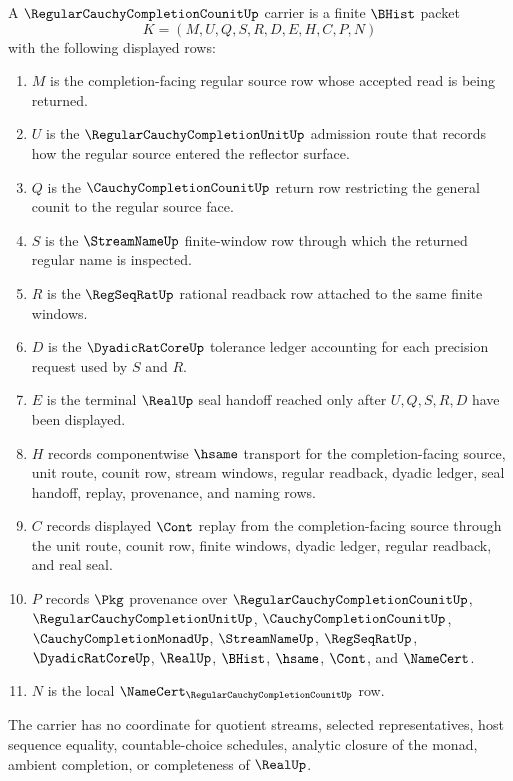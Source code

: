 \begin{definition}
\label{def:regular-cauchy-completion-counit-carrier}
A $\RegularCauchyCompletionCounitUp$ carrier is a finite $\BHist$ packet
$$
K=(M,U,Q,S,R,D,E,H,C,P,N)
$$
with the following displayed rows:
\begin{enumerate}
\item $M$ is the completion-facing regular source row whose accepted read is being returned.
\item $U$ is the $\RegularCauchyCompletionUnitUp$ admission route that records how the regular source entered the reflector surface.
\item $Q$ is the $\CauchyCompletionCounitUp$ return row restricting the general counit to the regular source face.
\item $S$ is the $\StreamNameUp$ finite-window row through which the returned regular name is inspected.
\item $R$ is the $\RegSeqRatUp$ rational readback row attached to the same finite windows.
\item $D$ is the $\DyadicRatCoreUp$ tolerance ledger accounting for each precision request used by $S$ and $R$.
\item $E$ is the terminal $\RealUp$ seal handoff reached only after $U,Q,S,R,D$ have been displayed.
\item $H$ records componentwise $\hsame$ transport for the completion-facing source, unit route, counit row, stream windows, regular readback, dyadic ledger, seal handoff, replay, provenance, and naming rows.
\item $C$ records displayed $\Cont$ replay from the completion-facing source through the unit route, counit row, finite windows, dyadic ledger, regular readback, and real seal.
\item $P$ records $\Pkg$ provenance over $\RegularCauchyCompletionCounitUp$, $\RegularCauchyCompletionUnitUp$, $\CauchyCompletionCounitUp$, $\CauchyCompletionMonadUp$, $\StreamNameUp$, $\RegSeqRatUp$, $\DyadicRatCoreUp$, $\RealUp$, $\BHist$, $\hsame$, $\Cont$, and $\NameCert$.
\item $N$ is the local $\NameCert_{\RegularCauchyCompletionCounitUp}$ row.
\end{enumerate}
The carrier has no coordinate for quotient streams, selected representatives, host sequence equality, countable-choice schedules, analytic closure of the monad, ambient completion, or completeness of $\RealUp$.
\end{definition}


